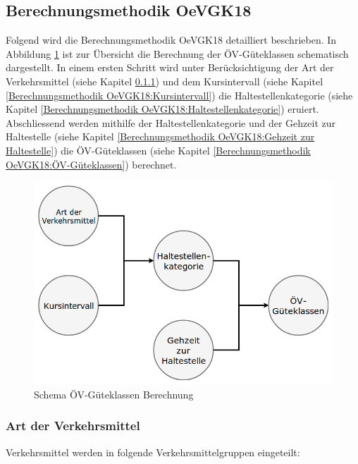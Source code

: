 \subsection{Berechnungsmethodik OeVGK18}
\label{Berechnungsmethodik OeVGK18}
Folgend wird die Berechnungsmethodik \gls{OeVGK18} detailliert beschrieben.
In Abbildung \ref{fig:Flow_OeVGK_Brechnung} ist zur Übersicht die Berechnung der \acs{ÖV}-Güteklassen schematisch dargestellt.
In einem ersten Schritt wird unter Berücksichtigung der Art der Verkehrsmittel (siehe Kapitel \ref{Berechnungsmethodik OeVGK18:Art der Verkehrsmittel}) und dem Kursintervall (siehe Kapitel \ref{Berechnungsmethodik OeVGK18:Kursintervall}) die Haltestellenkategorie (siehe Kapitel \ref{Berechnungsmethodik OeVGK18:Haltestellenkategorie}) eruiert.
Abschliessend werden mithilfe der Haltestellenkategorie und der Gehzeit zur Haltestelle (siehe Kapitel \ref{Berechnungsmethodik OeVGK18:Gehzeit zur Haltestelle}) die ÖV-Güteklassen (siehe Kapitel \ref{Berechnungsmethodik OeVGK18:ÖV-Güteklassen}) berechnet.

\begin{figure}[ht]
    \centering
    \includegraphics[width=0.7\linewidth]{technicalreport/img/Flow_OeVGK_Brechnung}
    \caption[Schema ÖV-Güteklassen Berechnung]{Schema ÖV-Güteklassen Berechnung}
    \label{fig:Flow_OeVGK_Brechnung}
\end{figure}

\subsubsection{Art der Verkehrsmittel}
\label{Berechnungsmethodik OeVGK18:Art der Verkehrsmittel}
Verkehrsmittel werden in folgende Verkehrsmittelgruppen eingeteilt:

